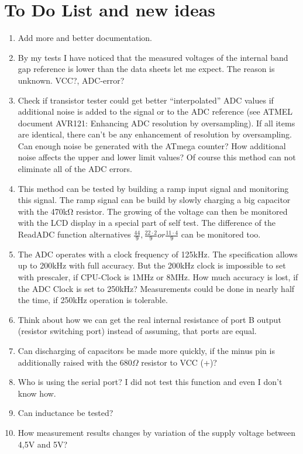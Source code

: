 
\chapter{To Do List and new ideas}
\label{sec:todo}

\begin{enumerate}
\item Add more and better documentation.
\item By my tests I have noticed that the measured voltages of the internal band gap reference is lower than the data sheets let me expect. The reason is unknown. VCC?, ADC-error?
\item Check if transistor tester could get better “interpolated” ADC values if additional noise is added to the signal or to the ADC reference (see ATMEL document AVR121: Enhancing ADC resolution by oversampling).
If all items are identical, there can't be any enhancement of resolution by oversampling. Can enough noise be generated with the ATmega counter?
How additional noise affects  the upper and lower limit values?
Of course this method can not eliminate all of the ADC errors. 
\item This method can be tested by building a ramp input signal and monitoring this signal.
The ramp signal can be build by slowly charging a big capacitor with the 470kΩ resistor.
The growing of the voltage can then be monitored with the LCD display in a special part of self test.
The difference of the ReadADC function alternatives  \(\frac{44}{9}, \frac{22\cdot2}{9} or \frac{11\cdot4}{9}\) can be monitored too.
\item The ADC operates with a clock frequency of 125kHz. The specification allows up to 200kHz with full accuracy.
But the 200kHz clock is impossible to set with prescaler, if CPU-Clock is 1MHz or 8MHz.
How much accuracy is lost, if the ADC Clock is set to 250kHz?
Measurements could be done in nearly half the time, if 250kHz operation is tolerable.
\item Think about how we can get the real internal resistance of port B output (resistor switching port) instead of assuming, that ports are equal.
\item Can discharging of capacitors be made more quickly, if the minus pin is additionally raised
with the \(680\Omega\) resistor to VCC (+)?
\item Who is using the serial port? I did not test this function and even I don't know how.
\item Can inductance be tested?
\item How measurement results changes by variation of  the  supply voltage between 4,5V and 5V? 

\end{enumerate}

